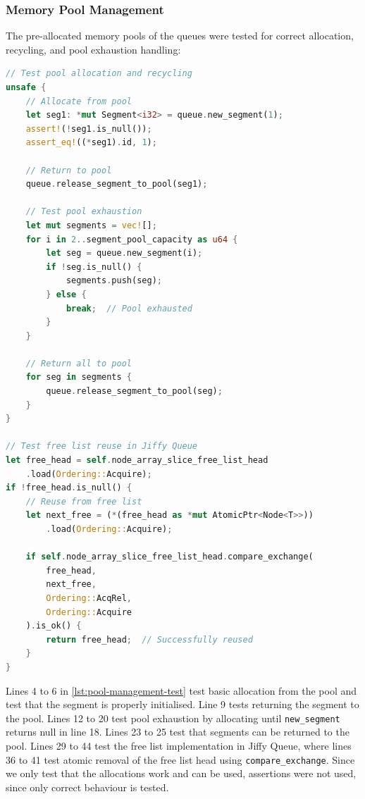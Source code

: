 \subsubsection{Memory Pool Management}
The pre-allocated memory pools of the queues were tested for correct allocation, recycling, and pool exhaustion handling:

\begin{lstlisting}[language=Rust, style=boxed, caption={Memory pool management test}, label={lst:pool-management-test}]
// Test pool allocation and recycling
unsafe {
    // Allocate from pool
    let seg1: *mut Segment<i32> = queue.new_segment(1);
    assert!(!seg1.is_null());
    assert_eq!((*seg1).id, 1);
    
    // Return to pool
    queue.release_segment_to_pool(seg1);
    
    // Test pool exhaustion
    let mut segments = vec![];
    for i in 2..segment_pool_capacity as u64 {
        let seg = queue.new_segment(i);
        if !seg.is_null() {
            segments.push(seg);
        } else {
            break;  // Pool exhausted
        }
    }
    
    // Return all to pool
    for seg in segments {
        queue.release_segment_to_pool(seg);
    }
}

// Test free list reuse in Jiffy Queue
let free_head = self.node_array_slice_free_list_head
    .load(Ordering::Acquire);
if !free_head.is_null() {
    // Reuse from free list
    let next_free = (*(free_head as *mut AtomicPtr<Node<T>>))
        .load(Ordering::Acquire);
        
    if self.node_array_slice_free_list_head.compare_exchange(
        free_head, 
        next_free, 
        Ordering::AcqRel, 
        Ordering::Acquire
    ).is_ok() {
        return free_head;  // Successfully reused
    }
}
\end{lstlisting}

Lines 4 to 6 in \cref{lst:pool-management-test} test basic allocation from the pool and test that the segment is properly initialised. Line 9 tests returning the segment to the pool. Lines 12 to 20 test pool exhaustion by allocating until \texttt{new\_segment} returns null in line 18. Lines 23 to 25 test that segments can be returned to the pool. Lines 29 to 44 test the free list implementation in Jiffy Queue, where lines 36 to 41 test atomic removal of the free list head using \texttt{compare\_exchange}. Since we only test that the allocations work and can be used, assertions were not used, since only correct behaviour is tested.

